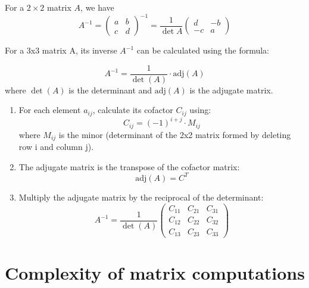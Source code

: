 \documentclass[11pt, %
	oneside, %
	english, %
	onehalfspacing, %
	parskip, %
	]{article} %
\theoremstyle{definition}
\begin{document}
For a $2 \times 2$ matrix $A$, we have
\begin{equation*}
	A^{-1} =
	\begin{pmatrix}
		a & b \\
		c & d
	\end{pmatrix}^{-1}
	=
	\frac{1}{\det A}
	\begin{pmatrix}
		d & -b \\
		-c & a
	\end{pmatrix}
\end{equation*}





For a 3x3 matrix A, its inverse $A^{-1}$ can be calculated using the formula:

$$
A^{-1} = \frac{1}{\det(A)} \cdot \text{adj}(A)
$$
where $\det(A)$ is the determinant and $\text{adj}(A)$ is the adjugate matrix.

\begin{enumerate}
	\item For each element $a_{ij}$, calculate its cofactor $C_{ij}$ using:
	$$C_{ij} = (-1)^{i+j} \cdot M_{ij}$$
	where $M_{ij}$ is the minor (determinant of the 2x2 matrix formed by deleting row i and column j).
	\item The adjugate matrix is the transpose of the cofactor matrix:
	$$\text{adj}(A) = C^T$$
	\item Multiply the adjugate matrix by the reciprocal of the determinant:
	$$A^{-1} = \frac{1}{\det(A)} \begin{pmatrix} C_{11} & C_{21} & C_{31} \\ C_{12} & C_{22} & C_{32} \\ C_{13} & C_{23} & C_{33} \end{pmatrix}$$
\end{enumerate}







\section{Complexity of matrix computations}
\end{document}
